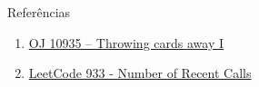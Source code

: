 \begin{frame}[fragile]{Referências}

    \begin{enumerate}
        \item \href{https://onlinejudge.org/index.php?option=com_onlinejudge&Itemid=8&category=24&page=show_problem&problem=1876}{OJ 10935 -- Throwing cards away I}

        \item \href{https://leetcode.com/problems/number-of-recent-calls/}{LeetCode 933 - Number of Recent Calls}
 
    \end{enumerate}

\end{frame}
